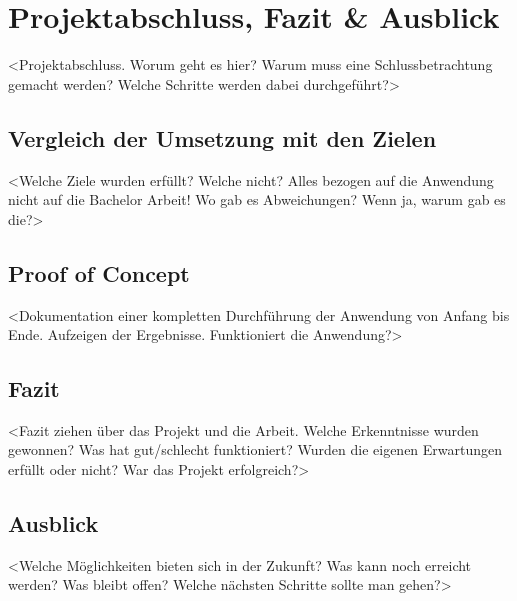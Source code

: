 
\chapter{Projektabschluss, Fazit \& Ausblick}\label{cha:Schlussbetrachtung}
<Projektabschluss. Worum geht es hier? Warum muss eine Schlussbetrachtung gemacht werden? Welche Schritte werden dabei durchgeführt?>

\section{Vergleich der Umsetzung mit den Zielen}
<Welche Ziele wurden erfüllt? Welche nicht? Alles bezogen auf die Anwendung nicht auf die Bachelor Arbeit! Wo gab es Abweichungen? Wenn ja, warum gab es die?>

\section{Proof of Concept}
<Dokumentation einer kompletten Durchführung der Anwendung von Anfang bis Ende. Aufzeigen der Ergebnisse. Funktioniert die Anwendung?>

\section{Fazit}\label{sec:Fazit}
<Fazit ziehen über das Projekt und die Arbeit. Welche Erkenntnisse wurden gewonnen? Was hat gut/schlecht funktioniert? Wurden die eigenen Erwartungen erfüllt oder nicht? War das Projekt erfolgreich?>

\section{Ausblick}\label{sec:Ausblick}
<Welche Möglichkeiten bieten sich in der Zukunft? Was kann noch erreicht werden? Was bleibt offen? Welche nächsten Schritte sollte man gehen?>